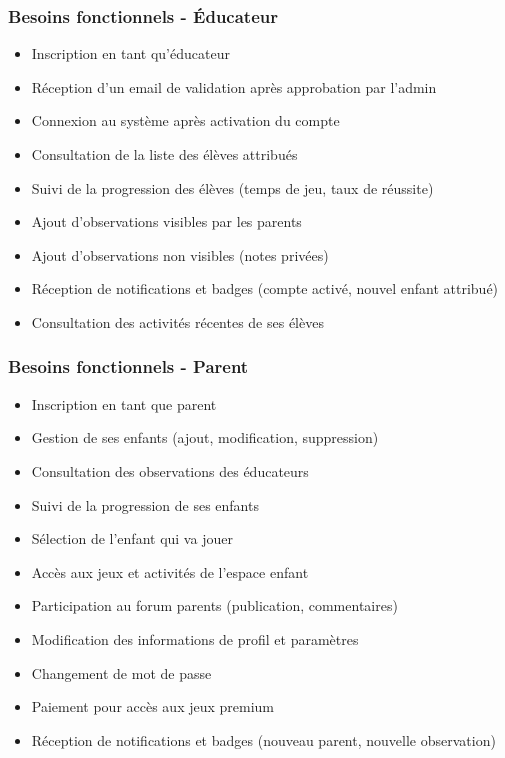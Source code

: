 \documentclass[12pt,a4paper]{report}
\begin{document}
\subsubsection{Besoins fonctionnels - Éducateur}

\begin{itemize}
    \item Inscription en tant qu'éducateur
    \item Réception d'un email de validation après approbation par l'admin
    \item Connexion au système après activation du compte
    \item Consultation de la liste des élèves attribués
    \item Suivi de la progression des élèves (temps de jeu, taux de réussite)
    \item Ajout d'observations visibles par les parents
    \item Ajout d'observations non visibles (notes privées)
    \item Réception de notifications et badges (compte activé, nouvel enfant attribué)
    \item Consultation des activités récentes de ses élèves
\end{itemize}

\subsubsection{Besoins fonctionnels - Parent}

\begin{itemize}
    \item Inscription en tant que parent
    \item Gestion de ses enfants (ajout, modification, suppression)
    \item Consultation des observations des éducateurs
    \item Suivi de la progression de ses enfants
    \item Sélection de l'enfant qui va jouer
    \item Accès aux jeux et activités de l'espace enfant
    \item Participation au forum parents (publication, commentaires)
    \item Modification des informations de profil et paramètres
    \item Changement de mot de passe
    \item Paiement pour accès aux jeux premium
    \item Réception de notifications et badges (nouveau parent, nouvelle observation)
\end{itemize}
\end{document}
